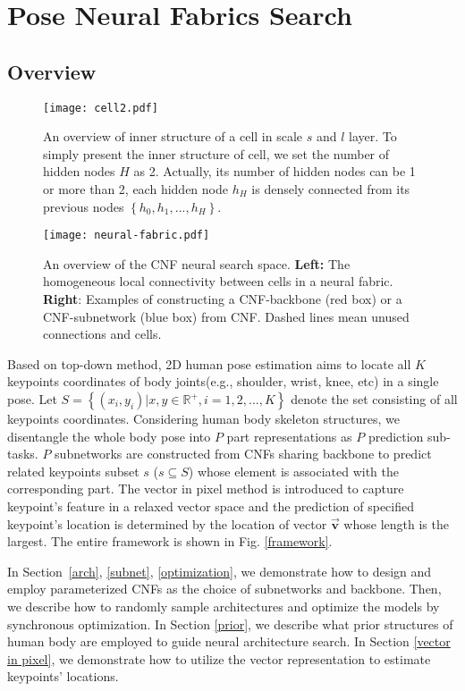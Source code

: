\documentclass[journal]{IEEEtran}
\begin{document}
\section{Pose Neural Fabrics Search}

\subsection{Overview}

\begin{figure}
	
	\centering
\texttt{[image: cell2.pdf]}
	\caption{An overview of inner structure of a cell in scale $s$ and $l$ layer. To simply present the inner structure of cell, we set the number of hidden nodes $H$ as 2. Actually, its number of hidden nodes can be 1 or more than 2, each hidden node $h_H$ is densely connected from its previous nodes $\left\lbrace h_0,h_1,...,h_H \right\rbrace $.   }
	\label{cell}
\end{figure}

\begin{figure*}
	
	\centering
\texttt{[image: neural-fabric.pdf]}
\caption{An overview of the CNF neural search space. \textbf{Left:} The homogeneous local connectivity between cells in a neural fabric. \textbf{Right}: Examples of constructing a CNF-backbone (red box) or a CNF-subnetwork (blue box) from CNF. Dashed lines mean unused connections and cells.}
	\label{fabric}
\end{figure*}


Based on top-down method, 2D human pose estimation aims to locate all $K$ keypoints coordinates of body joints(e.g., shoulder, wrist, knee, etc) in a single pose. Let $S=\left \{(x_i,y_i)|x,y\in \mathbb{R^+}, i=1,2,...,K  \right \} $ denote the set consisting of all keypoints coordinates. Considering human body skeleton structures, we disentangle the whole body pose into $P$ part representations as $P$ prediction sub-tasks. $P$ subnetworks are constructed from CNFs sharing backbone to  predict related keypoints subset $s$ ($s\subseteq S$) whose element is associated with the corresponding part. The vector in pixel method is introduced to capture keypoint's feature in a relaxed vector space and the prediction of specified keypoint's location is determined by the location of vector $\vec{\mathbf{v}}$ whose length is the largest. The entire framework is shown in Fig. \ref{framework}.

In Section~\ref{arch}, \ref{subnet}, \ref{optimization}, we demonstrate how to design and employ parameterized CNFs as the choice of subnetworks and backbone. Then, we describe how to randomly sample architectures and optimize the models by synchronous optimization. In Section \ref{prior}, we describe what prior structures of human body are employed to guide neural architecture search. In Section \ref{vector in pixel}, we demonstrate how to utilize the vector representation to estimate keypoints' locations.
\end{document}
